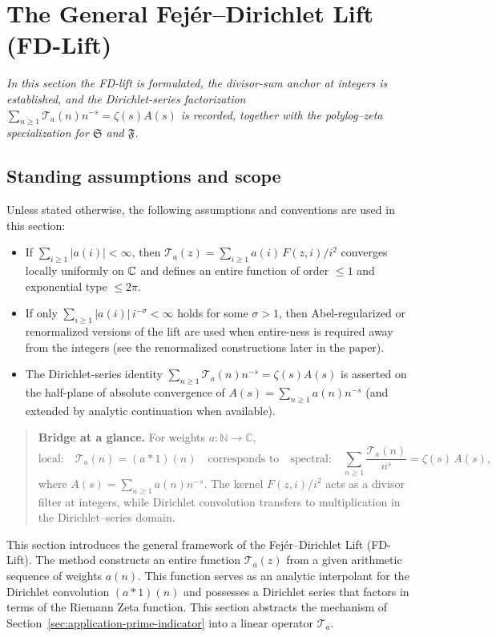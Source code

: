 \section{The General Fej\'er--Dirichlet Lift (FD-Lift)}\label{sec:fd-lift-main}

\par\smallskip
\noindent\textit{In this section the FD-lift is formulated, the divisor-sum anchor at integers is established, and the Dirichlet-series factorization $\sum_{n\ge1}\mathcal T_a(n)n^{-s}=\zeta(s)A(s)$ is recorded, together with the polylog–zeta specialization for $\mathfrak S$ and $\mathfrak F$.}
\par\medskip

\subsection*{Standing assumptions and scope}
\noindent Unless stated otherwise, the following assumptions and conventions are used in this section:
\begin{itemize}
  \item If $\sum_{i\ge1}|a(i)|<\infty$, then $\mathcal T_a(z)=\sum_{i\ge1} a(i)\,F(z,i)/i^2$ converges locally uniformly on $\mathbb{C}$ and defines an entire function of order $\le 1$ and exponential type $\le 2\pi$.
  \item If only $\sum_{i\ge1} |a(i)|\,i^{-\sigma}<\infty$ holds for some $\sigma>1$, then Abel-regularized or renormalized versions of the lift are used when entire-ness is required away from the integers (see the renormalized constructions later in the paper).
  \item The Dirichlet-series identity $\sum_{n\ge1}\mathcal T_a(n)n^{-s}=\zeta(s)A(s)$ is asserted on the half-plane of absolute convergence of $A(s)=\sum_{n\ge1}a(n)n^{-s}$ (and extended by analytic continuation when available).
\end{itemize}

\begin{quote}\small
\textbf{Bridge at a glance.} For weights $a:\mathbb N\to\mathbb C$,
\[
\text{local:}\quad \mathcal T_a(n)=(a*1)(n)
\quad \text{corresponds to} \quad
\text{spectral:}\quad \sum_{n\ge1}\frac{\mathcal T_a(n)}{n^s}=\zeta(s)\,A(s),
\]
where $A(s)=\sum_{n\ge1}a(n)n^{-s}$. The kernel $F(z,i)/i^2$ acts as a divisor filter at integers, while Dirichlet convolution transfers to multiplication in the Dirichlet–series domain.
\end{quote}

This section introduces the general framework of the Fej\'er--Dirichlet Lift (FD-Lift). The method constructs an entire function $\mathcal{T}_a(z)$ from a given arithmetic sequence of weights $a(n)$. This function serves as an analytic interpolant for the Dirichlet convolution $(a*1)(n)$ and possesses a Dirichlet series that factors in terms of the Riemann Zeta function.
This section abstracts the mechanism of Section~\ref{sec:application-prime-indicator} into a linear operator $\mathcal{T}_a$.

